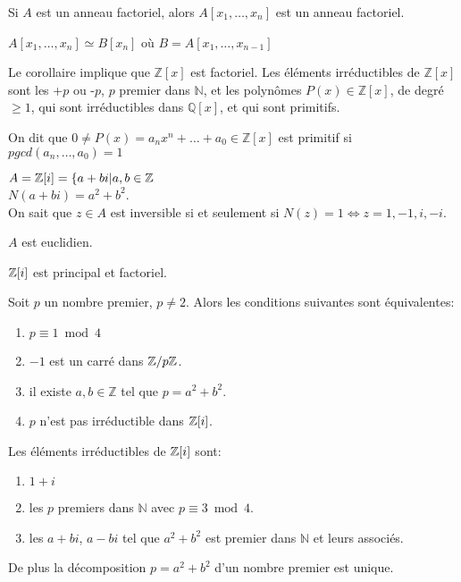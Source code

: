 \documentclass[12pt,a4paper]{article}
\begin{document}
\begin{flushleft}
\begin{cor}
Si $A$ est un anneau factoriel, alors $A[x_1, \ldots , x_n]$ est un anneau factoriel.
\end{cor}

\begin{lem}
$A[x_1 , \ldots , x_n] \simeq B[x_n]$ où $B = A[x_1 , \ldots , x_{n-1}]$
\end{lem}

\begin{rem}
Le corollaire implique que $\mathbb{Z} [x]$ est factoriel. Les éléments irréductibles de $\mathbb{Z} [x]$ sont les +$p$ ou -$p$, $p$ premier dans $\mathbb{N}$, et les polynômes $P(x) \in \mathbb{Z} [x]$, de degré $\geq 1$, qui sont irréductibles dans $\mathbb{Q} [x]$, et qui sont primitifs. 
\end{rem}

\begin{rem}
On dit que $0 \neq P(x) = a_n x^n + \ldots + a_0 \in \mathbb{Z} [x]$ est primitif si $pgcd(a_n , \ldots , a_0) = 1$
\end{rem}

\begin{mydef}
$A = \mathbb{Z} [i] = \{ a + bi | a,b \in \mathbb{Z}$\\
$N(a + bi) = a^2 + b^2$.\\
On sait que $z \in A$ est inversible si et seulement si $N(z) = 1 \Leftrightarrow z = 1, -1, i, -i$.
\end{mydef}

\begin{thm}
$A$ est euclidien.
\end{thm}

\begin{cor}
$\mathbb{Z} [i]$ est principal et factoriel.
\end{cor}

\begin{thm}
Soit $p$ un nombre premier, $p \neq 2$. Alors les conditions suivantes sont équivalentes:
\begin{enumerate}
\item $p \equiv 1 \bmod 4$
\item $-1$ est un carré dans $\mathbb{Z} / p \mathbb{Z}$.
\item il existe $a, b \in \mathbb{Z}$ tel que $p = a^2 + b^2$.
\item $p$ n'est pas irréductible dans $\mathbb{Z} [i]$.
\end{enumerate}
\end{thm}

\begin{cor}
Les éléments irréductibles de $\mathbb{Z} [i]$ sont:
\begin{enumerate}
\item $1+i$
\item les $p$ premiers dans $\mathbb{N}$ avec $p \equiv 3 \bmod 4$.
\item les $a + bi$, $a - bi$ tel que $a^2 + b^2 $ est premier dans $\mathbb{N}$ et leurs associés.
\end{enumerate}
De plus la décomposition $p = a^2 + b^2$ d'un nombre premier est unique.
\end{cor}


\end{flushleft}
\end{document}
